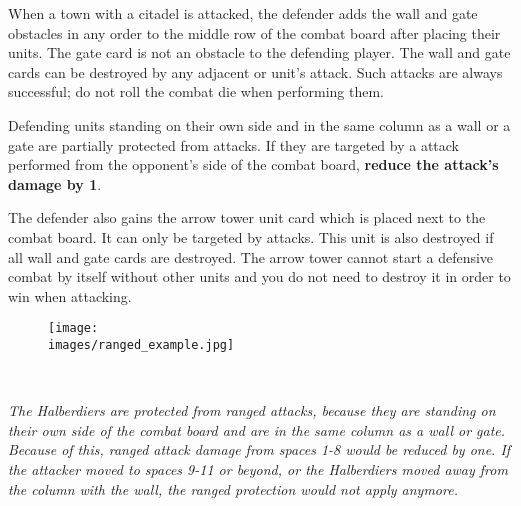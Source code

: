 When a town with a citadel is attacked, the defender adds the wall and gate obstacles in any order to the middle row of the combat board after placing their units.
The gate card is not an obstacle to the defending player.
The wall and gate cards can be destroyed by any adjacent  or  unit's attack.
Such attacks are always successful; do not roll the combat die when performing them.\par
Defending units standing on their own side and in the same column as a wall or a gate are partially protected from  attacks.
If they are targeted by a  attack performed from the opponent's side of the combat board, \textbf{reduce the attack's damage by 1}.
\par
The defender also gains the arrow tower unit card which is placed next to the combat board.
It can only be targeted by  attacks.
This unit is also destroyed if all wall and gate cards are destroyed.
The arrow tower cannot start a defensive combat by itself without other units and you do not need to destroy it in order to win when attacking.
\begin{figure}[h]
\centering
\texttt{[image: \\images/ranged\_example.jpg]}
\end{figure}\\
\begin{center}
\textit{The Halberdiers are protected from ranged attacks, because they are standing on their own side of the combat board and are in the same column as a wall or gate. Because of this, ranged attack damage from spaces 1-8 would be reduced by one. If the attacker moved to spaces 9-11 or beyond, or the Halberdiers moved away from the column with the wall, the ranged protection would not apply anymore.}
\end{center}

\clearpage
